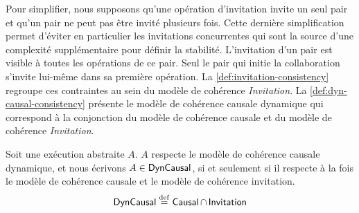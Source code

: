 Pour simplifier, nous supposons qu'une opération d'invitation invite un seul pair et qu'un pair ne peut pas être invité plusieurs fois.
Cette dernière simplification permet d'éviter en particulier les invitations concurrentes qui sont la source d'une complexité supplémentaire pour définir la stabilité.
L'invitation d'un pair est visible à toutes les opérations de ce pair.
Seul le pair qui initie la collaboration s'invite lui-même dans sa première opération.
La \autoref{def:invitation-consistency} regroupe ces contraintes au sein du modèle de cohérence \emph{Invitation}.
La \autoref{def:dyn-causal-consistency} présente le modèle de cohérence causale dynamique qui correspond à la conjonction du modèle de cohérence causale et du modèle de cohérence \emph{Invitation}.


\begin{definition}\label{def:dyn-causal-consistency}
    Soit une exécution abstraite $A$. $A$ respecte le modèle de cohérence causale dynamique, et nous écrivons $A \in \operatorname{\mathsf{DynCausal}}$, si et seulement si il respecte à la fois le modèle de cohérence causale et le modèle de cohérence invitation.
    \begin{equation*}
        \operatorname{\mathsf{DynCausal}} \overset{\mathrm{def}}{=} \operatorname{\mathsf{Causal}} \cap \operatorname{\mathsf{Invitation}}
    \end{equation*}
    \end{definition}

